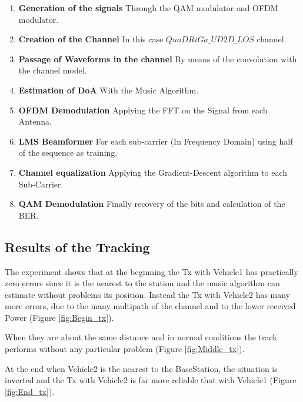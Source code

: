 \begin{enumerate}
    \item \textbf{Generation of the signals} Through the QAM modulator and OFDM modulator. 
    \item \textbf{Creation of the Channel} In this case $QuaDRiGa\_UD2D\_LOS$ channel.
    \item \textbf{Passage of Waveforms in the channel} By means of the convolution with the channel model.
    \item \textbf{Estimation of DoA} With the Music Algorithm.
    \item \textbf{OFDM Demodulation} Applying the FFT on the Signal from each Antenna.
    \item \textbf{LMS Beamformer} For each sub-carrier (In Frequency Domain) using half of the sequence as training.
    \item \textbf{Channel equalization} Applying the Gradient-Descent algorithm to each Sub-Carrier.
    \item \textbf{QAM Demodulation} Finally recovery of the bits and calculation of the BER.
\end{enumerate}


\subsection{Results of the Tracking}

The experiment shows that at the beginning the Tx with Vehicle1 has practically zero errors since it is the nearest to the station
and the music algorithm can estimate without problems its position. Instead the Tx with Vehicle2 has many more errors, due to 
the many multipath of the channel and to the lower received Power (Figure \ref{fig:Begin_tx}).

When they are about the same distance and in normal conditions the track performs without any particular problem (Figure \ref{fig:Middle_tx}).

At the end when Vehicle2 is the nearest to the BaseStation, the situation is inverted and the Tx with Vehicle2 is far more 
reliable that with Vehicle1 (Figure \ref{fig:End_tx}).

